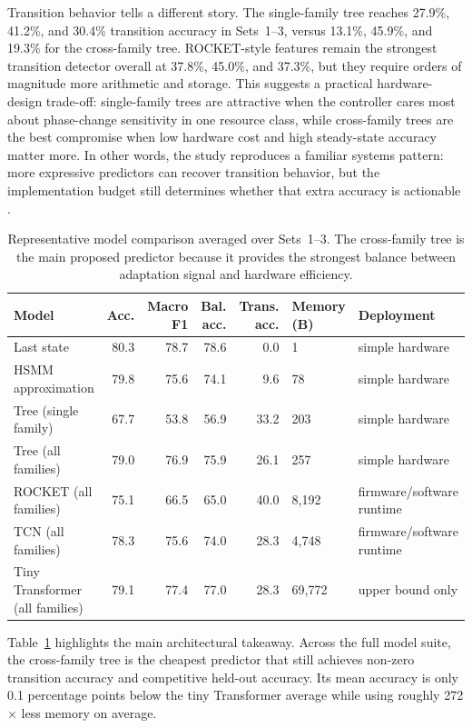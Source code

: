 \documentclass[10pt,twocolumn]{article}
\begin{document}
Transition behavior tells a different story.
The single-family tree reaches 27.9\%, 41.2\%, and 30.4\% transition accuracy in Sets~1--3, versus 13.1\%, 45.9\%, and 19.3\% for the cross-family tree.
ROCKET-style features remain the strongest transition detector overall at 37.8\%, 45.0\%, and 37.3\%, but they require orders of magnitude more arithmetic and storage.
This suggests a practical hardware-design trade-off:
single-family trees are attractive when the controller cares most about phase-change sensitivity in one resource class, while cross-family trees are the best compromise when low hardware cost and high steady-state accuracy matter more.
In other words, the study reproduces a familiar systems pattern: more expressive predictors can recover transition behavior, but the implementation budget still determines whether that extra accuracy is actionable \cite{kim2017p4,lozano2022phase,bai2018tcn,dempster2020rocket,vaswani2017attention}.

\begin{table}[t]
  \centering
  \small
  \caption{Representative model comparison averaged over Sets~1--3. The cross-family tree is the main proposed predictor because it provides the strongest balance between adaptation signal and hardware efficiency.}
  \label{tab:model-summary}
  \begin{tabular}{lrrrrll}
    \toprule
    Model & Acc. & Macro F1 & Bal. acc. & Trans. acc. & Memory (B) & Deployment \\
    \midrule
    Last state & 80.3 & 78.7 & 78.6 & 0.0 & 1 & simple hardware \\
    HSMM approximation & 79.8 & 75.6 & 74.1 & 9.6 & 78 & simple hardware \\
    Tree (single family) & 67.7 & 53.8 & 56.9 & 33.2 & 203 & simple hardware \\
    Tree (all families) & 79.0 & 76.9 & 75.9 & 26.1 & 257 & simple hardware \\
    ROCKET (all families) & 75.1 & 66.5 & 65.0 & 40.0 & 8{,}192 & firmware/software runtime \\
    TCN (all families) & 78.3 & 75.6 & 74.0 & 28.3 & 4{,}748 & firmware/software runtime \\
    Tiny Transformer (all families) & 79.1 & 77.4 & 77.0 & 28.3 & 69{,}772 & upper bound only \\
    \bottomrule
  \end{tabular}%
\end{table}

Table~\ref{tab:model-summary} highlights the main architectural takeaway.
Across the full model suite, the cross-family tree is the cheapest predictor that still achieves non-zero transition accuracy and competitive held-out accuracy.
Its mean accuracy is only 0.1 percentage points below the tiny Transformer average while using roughly 272$\times$ less memory on average.
\end{document}
